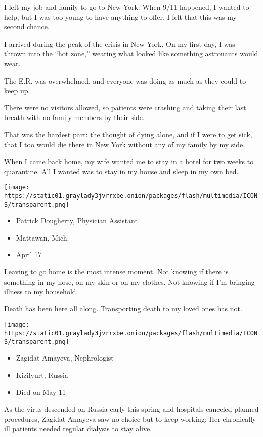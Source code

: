 I left my job and family to go to New York. When 9/11 happened, I wanted
to help, but I was too young to have anything to offer. I felt that this
was my second chance.

I arrived during the peak of the crisis in New York. On my first day, I
was thrown into the ``hot zone,'' wearing what looked like something
astronauts would wear.

The E.R. was overwhelmed, and everyone was doing as much as they could
to keep up.

There were no visitors allowed, so patients were crashing and taking
their last breath with no family members by their side.

That was the hardest part: the thought of dying alone, and if I were to
get sick, that I too would die there in New York without any of my
family by my side.

When I came back home, my wife wanted me to stay in a hotel for two
weeks to quarantine. All I wanted was to stay in my house and sleep in
my own bed.

\texttt{[image: https://static01.graylady3jvrrxbe.onion/packages/flash/multimedia/ICONS/transparent.png]}

\begin{itemize}
\tightlist
\item
  Patrick Dougherty, Physician Assistant
\item
  Mattawan, Mich.
\item
  April 17
\end{itemize}

Leaving to go home is the most intense moment. Not knowing if there is
something in my nose, on my skin or on my clothes. Not knowing if I'm
bringing illness to my household.

Death has been here all along. Transporting death to my loved ones has
not.

\texttt{[image: https://static01.graylady3jvrrxbe.onion/packages/flash/multimedia/ICONS/transparent.png]}

\begin{itemize}
\tightlist
\item
  Zagidat Amayeva, Nephrologist
\item
  Kizilyurt, Russia
\item
  Died on May 11
\end{itemize}

As the virus descended on Russia early this spring and hospitals
canceled planned procedures, Zagidat Amayeva saw no choice but to keep
working: Her chronically ill patients needed regular dialysis to stay
alive.

